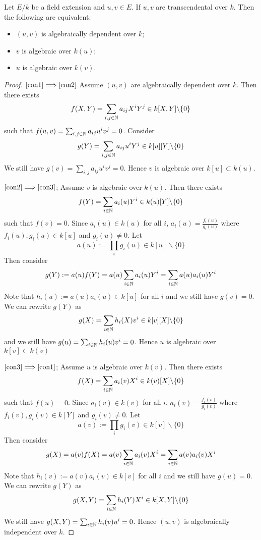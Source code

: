 \begin{lemma} \label {i9283hd01bxdo912ep01}
	Let $E/k$ be a field extension and $u,v \in E$. If $u,v$ are transcendental over $k$. 
	Then the following are equivalent:
\begin{itemize}
	\item \label{con1} $(u,v)$ is algebraically dependent over $k$;
	\item \label{con2} $v$ is algebraic over $k(u)$;
	\item \label{con3} $u$ is algebraic over $k(v)$.
\end{itemize}
\end{lemma}

\begin{proof}
	$\eqref{con1}  \Longrightarrow \eqref{con2} $ Assume $(u,v)$ 
	are algebraically dependent over $k$. Then there 
	exists $$ f(X,Y) = \sum_{i,j \in \mathbb{N}} a_{ij} X^iY^j \in 
	k[X,Y] \backslash \lbrace 0 \rbrace $$ such that
	$f(u,v) = \sum_{i,j \in \mathbb{N}} a_{ij} u^iv^j = 0 $. 
	Consider $$g(Y) = \sum_{i,j \in \mathbb{N}} a_{ij} u^iY^j 
	\in k[u][Y] \backslash \lbrace 0 \rbrace $$ We still 
	have $g(v) = \sum_{i,j} a_{ij} u^iv^j = 0 $. 
	Hence $v$ is algebraic over $k[u] \subset k(u)$. 


	$\eqref{con2} \Longrightarrow \eqref{con3} $; Assume $v$ is 
	algebraic over $k(u)$. Then there exists
	$$ f(Y) = \sum_{i\in \mathbb{N}} a_i(u)Y^i \in k(u)[Y] \backslash \lbrace 0 \rbrace $$ 
	such that $f(v) = 0$. Since $a_i(u) \in k(u)$ for 
	all $i$, $a_i(u) = \frac{f_i(u)}{g_i(u)} $ 
	where $f_i(u),g_i(u) \in k[u]$ and $g_i(u) \neq 0 $. 
	Let $$a(u) := \prod_i g_i(u) \in k[u] \backslash \lbrace 0 \rbrace $$ 
	Then consider $$ g(Y) := a(u)f(Y) = a(u)\sum_{i\in \mathbb{N}}
	a_i(u)Y^i = \sum_{i \in \mathbb{N}}a(u) a_i(u)Y^i $$ 
	Note that $h_i(u):=a(u)a_i(u) \in k[u] $ for all $i$ 
	and we still have $g(v) = 0 $. We can rewrite $g(Y)$ 
	as $$ g(X) = \sum_{i \in \mathbb{N}} h_i(X)v^i \in k[v][X] \backslash \lbrace 0 \rbrace $$ 
	and we still have  $g(u) = \sum_{i \in \mathbb{N}} h_i(u) v^i = 0 $. 
	Hence $u$ is algebraic over $k[v] \subset k(v)$ 

	$\eqref{con3} \Longrightarrow \eqref{con1}$; 
	Assume $u$ is algebraic over $k(v)$. Then there 
	exists $$ f(X) = \sum_{i \in \mathbb{N} } a_i(v)X^i \in k(v)[X] 
	\backslash \lbrace 0 \rbrace $$ such that $f(u) = 0$. 
	Since $a_i(v) \in k(v) $ for all $i$, $a_i(v)= \frac{f_i(v)}{g_i(v)}$ 
	where $f_i(v),g_i(v) \in k[Y]$ and $g_i(v) \neq 0 $. 
	Let $$a(v) := \prod_i g_i(v) \in k[v] \backslash \lbrace 0 \rbrace  $$ 
	Then consider $$ g(X) = a(v)f(X) = a(v)\sum_{i \in \mathbb{N}} a_i(v)X^i 
	= \sum_{i \in \mathbb{N}} a(v)a_i(v)X^i $$ Note that
	$h_i(v):=a(v)a_i(v) \in k[v] $ for all $i$ and we still 
	have $g(u) = 0 $. We can rewrite $g(Y)$ as
	$$ g(X,Y) = \sum_{i \in \mathbb{N}} h_i(Y)X^i \in k[X,Y] 
	\backslash \lbrace 0 \rbrace  $$ We still have
	$g(X,Y) = \sum_{i \in \mathbb{N}} h_i(v) u^i = 0 $. 
	Hence $(u,v)$ is algebraically independent over $k$.
\end{proof}

